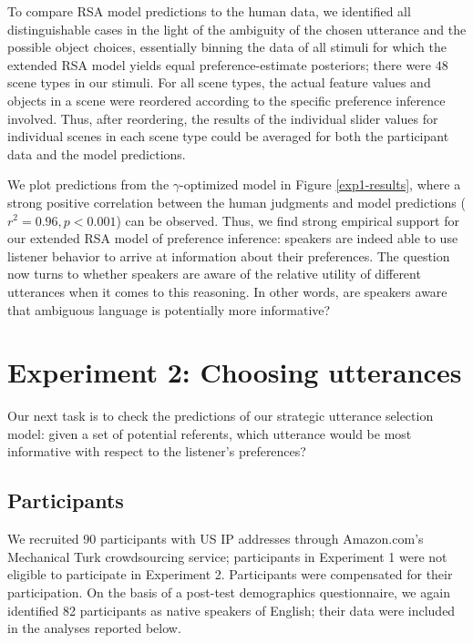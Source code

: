 \documentclass[10pt,a4paper]{article}
\begin{document}
To compare RSA model predictions to the human data, we identified all distinguishable cases in the light of the ambiguity of the chosen utterance and the possible object choices, essentially binning the data of all stimuli for which the extended RSA model yields equal preference-estimate posteriors; there were $48$ scene types in our stimuli.
For all scene types, the actual feature values and objects in a scene were reordered according to the specific preference inference involved. 
Thus, after reordering, the results of the individual slider values for individual scenes in each scene type could be averaged for both the participant data and the model predictions. 


We plot predictions from the $\gamma$-optimized model in Figure \ref{exp1-results}, where a strong positive correlation between the human judgments and model predictions ($r^2 = 0.96, p < 0.001$) can be observed. Thus, we find strong empirical support for our extended RSA model of preference inference: speakers are indeed able to use listener behavior to arrive at information about their preferences. The question now turns to whether speakers are aware of the relative utility of different utterances when it comes to this reasoning. In other words, are speakers aware that ambiguous language is potentially more informative?




\section{Experiment 2: Choosing utterances}

Our next task is to check the predictions of our strategic utterance selection model: given a set of potential referents, which utterance would be most informative with respect to the listener's preferences?

\subsection{Participants}

We recruited 90 participants with US IP addresses through Amazon.com's Mechanical Turk crowdsourcing service; participants in Experiment 1 were not eligible to participate in Experiment 2. Participants were compensated for their participation. On the basis of a post-test demographics questionnaire, we again identified  82 participants as native speakers of English; their data were included in the analyses reported below.
\end{document}
